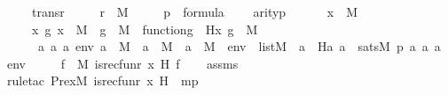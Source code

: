 \begin{isabellebody}
\ \ \ \ {\isachardoublequoteopen}trans{\isacharparenleft}{\kern0pt}r{\isacharparenright}{\kern0pt}{\isachardoublequoteclose}\ \isanewline
\ \ \ \ {\isachardoublequoteopen}r\ {\isasymin}\ M{\isachardoublequoteclose}\ \isanewline
\ \ \ \ {\isachardoublequoteopen}p\ {\isasymin}\ formula{\isachardoublequoteclose}\isanewline
\ \ \ \ {\isachardoublequoteopen}arity{\isacharparenleft}{\kern0pt}p{\isacharparenright}{\kern0pt}\ {\isasymle}\ {}{\isachardoublequoteclose}\isanewline
\ \ \ \ {\isachardoublequoteopen}x\ {\isasymin}\ M{\isachardoublequoteclose}\ \isanewline
\ \ \ \ {\isachardoublequoteopen}{\isacharparenleft}{\kern0pt}{\isasymAnd}x\ g{\isachardot}{\kern0pt}\ x\ {\isasymin}\ M\ {\isasymLongrightarrow}\ g\ {\isasymin}\ M\ {\isasymLongrightarrow}\ function{\isacharparenleft}{\kern0pt}g{\isacharparenright}{\kern0pt}\ {\isasymLongrightarrow}\ H{\isacharparenleft}{\kern0pt}x{\isacharcomma}{\kern0pt}\ g{\isacharparenright}{\kern0pt}\ {\isasymin}\ M{\isacharparenright}{\kern0pt}{\isachardoublequoteclose}\ \isanewline
\ \ \ \ {\isachardoublequoteopen}\ {\isacharparenleft}{\kern0pt}{\isasymAnd}a{}\ a{}\ a{}\ env{\isachardot}{\kern0pt}\ a{}\ {\isasymin}\ M\ {\isasymLongrightarrow}\ a{}\ {\isasymin}\ M\ {\isasymLongrightarrow}\ a{}\ {\isasymin}\ M\ {\isasymLongrightarrow}\ env\ {\isasymin}\ list{\isacharparenleft}{\kern0pt}M{\isacharparenright}{\kern0pt}\ {\isasymLongrightarrow}\ a{}\ {\isacharequal}{\kern0pt}\ H{\isacharparenleft}{\kern0pt}a{}{\isacharcomma}{\kern0pt}\ a{}{\isacharparenright}{\kern0pt}\ {\isasymlongleftrightarrow}\ sats{\isacharparenleft}{\kern0pt}M{\isacharcomma}{\kern0pt}\ p{\isacharcomma}{\kern0pt}\ {\isacharbrackleft}{\kern0pt}a{}{\isacharcomma}{\kern0pt}\ a{}{\isacharcomma}{\kern0pt}\ a{}{\isacharbrackright}{\kern0pt}\ {\isacharat}{\kern0pt}\ env{\isacharparenright}{\kern0pt}{\isacharparenright}{\kern0pt}{\isachardoublequoteclose}\ \ \isanewline
\ \ \ {\isachardoublequoteopen}{\isasymexists}f\ {\isasymin}\ M{\isachardot}{\kern0pt}\ is{\isacharunderscore}{\kern0pt}recfun{\isacharparenleft}{\kern0pt}r{\isacharcomma}{\kern0pt}\ x{\isacharcomma}{\kern0pt}\ H{\isacharcomma}{\kern0pt}\ f{\isacharparenright}{\kern0pt}{\isachardoublequoteclose}\isanewline
%
\isadelimproof
\isanewline
\ \ %
\endisadelimproof
%
\isatagproof
{}\isamarkupfalse%
\ assms\ \isanewline
\ \ \isamarkupfalse%
{\isacharparenleft}{\kern0pt}rule{\isacharunderscore}{\kern0pt}tac\ P{\isacharequal}{\kern0pt}{\isachardoublequoteopen}rex{\isacharparenleft}{\kern0pt}{\isacharhash}{\kern0pt}{\isacharhash}{\kern0pt}M{\isacharcomma}{\kern0pt}\ is{\isacharunderscore}{\kern0pt}recfun{\isacharparenleft}{\kern0pt}r{\isacharcomma}{\kern0pt}\ x{\isacharcomma}{\kern0pt}\ H{\isacharparenright}{\kern0pt}{\isacharparenright}{\kern0pt}{\isachardoublequoteclose}\ \ mp{\isacharparenright}{\kern0pt}\ \isanewline

\end{isabellebody}
